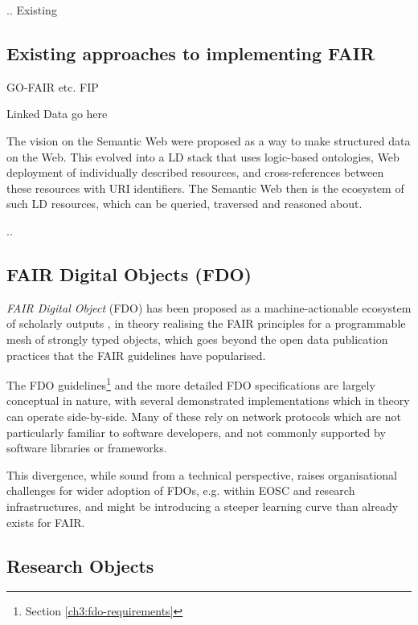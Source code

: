 .. Existing


\subsection{Existing approaches to implementing FAIR}

GO-FAIR etc. 
FIP

Linked Data go here


The vision on the Semantic Web \cite{Berners-Lee 1999} were proposed as a way to make structured data on the Web. This evolved into a \acrfull{LD} stack that uses logic-based ontologies, Web deployment of individually described resources, and cross-references between these resources with \acrfull{URI} identifiers. The Semantic Web then is the ecosystem of such \acrlong{LD} resources, which can be queried, traversed and reasoned about. 

..


\subsection{FAIR Digital Objects (FDO)}

\emph{FAIR Digital Object} (\acrshort{FDO}) has been proposed as a machine-actionable ecosystem of scholarly outputs \cite{Schultes 2019}, in theory realising the \acrshort{FAIR} principles 
for a programmable mesh of strongly typed objects, which goes beyond the open data publication practices that the FAIR guidelines have popularised.

The FDO guidelines\footnote{Section \vref{ch3:fdo-requirements}} \cite{Anders 2023} and the more detailed FDO specifications \cite{Ivonne 2023} are largely conceptual in nature, with several demonstrated implementations \cite{Wittenburg 2022a,Lannom 2022a} which in theory can operate side-by-side. Many of these rely on network protocols \cite{Reilly 2009,Sun 2003a} which are not particularly familiar to software developers, and not commonly supported by software libraries or frameworks.

This divergence, while sound from a technical perspective, raises organisational challenges for wider adoption of FDOs, e.g. within EOSC and research infrastructures, and might be introducing a steeper learning curve than already exists for FAIR.



\subsection{Research Objects}


